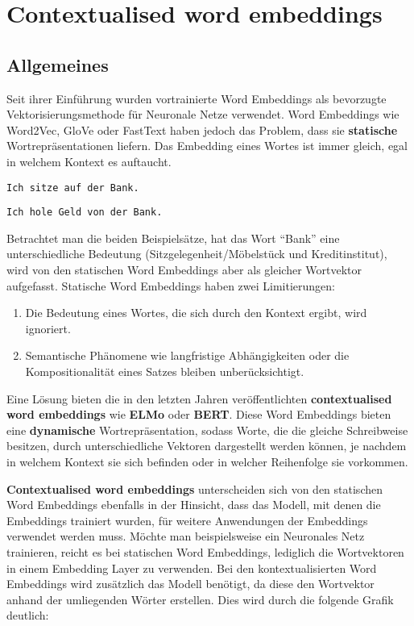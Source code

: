 \documentclass[11pt]{article}
\providecommand{\tightlist}{%
      \setlength{\itemsep}{0pt}\setlength{\parskip}{0pt}}
\begin{document}
    \hypertarget{contextualised-word-embeddings}{%
\section{Contextualised word
embeddings}\label{contextualised-word-embeddings}}

\hypertarget{allgemeines}{%
\subsection{Allgemeines}\label{allgemeines}}

Seit ihrer Einführung wurden vortrainierte Word Embeddings als
bevorzugte Vektorisierungsmethode für Neuronale Netze verwendet. Word
Embeddings wie Word2Vec, GloVe oder FastText haben jedoch das Problem,
dass sie \textbf{statische} Wortrepräsentationen liefern. Das Embedding
eines Wortes ist immer gleich, egal in welchem Kontext es auftaucht.

\texttt{Ich\ sitze\ auf\ der\ Bank.}

\texttt{Ich\ hole\ Geld\ von\ der\ Bank.}

Betrachtet man die beiden Beispielsätze, hat das Wort ``Bank'' eine
unterschiedliche Bedeutung (Sitzgelegenheit/Möbelstück und
Kreditinstitut), wird von den statischen Word Embeddings aber als
gleicher Wortvektor aufgefasst. Statische Word Embeddings haben zwei
Limitierungen:

\begin{enumerate}
\def\labelenumi{\arabic{enumi}.}
\tightlist
\item
  Die Bedeutung eines Wortes, die sich durch den Kontext ergibt, wird
  ignoriert.
\item
  Semantische Phänomene wie langfristige Abhängigkeiten oder die
  Kompositionalität eines Satzes bleiben unberücksichtigt.
\end{enumerate}

Eine Lösung bieten die in den letzten Jahren veröffentlichten
\textbf{contextualised word embeddings} wie \textbf{ELMo} oder
\textbf{BERT}. Diese Word Embeddings bieten eine \textbf{dynamische}
Wortrepräsentation, sodass Worte, die die gleiche Schreibweise besitzen,
durch unterschiedliche Vektoren dargestellt werden können, je nachdem in
welchem Kontext sie sich befinden oder in welcher Reihenfolge sie
vorkommen.

\textbf{Contextualised word embeddings} unterscheiden sich von den
statischen Word Embeddings ebenfalls in der Hinsicht, dass das Modell,
mit denen die Embeddings trainiert wurden, für weitere Anwendungen der
Embeddings verwendet werden muss. Möchte man beispielsweise ein
Neuronales Netz trainieren, reicht es bei statischen Word Embeddings,
lediglich die Wortvektoren in einem Embedding Layer zu verwenden. Bei
den kontextualisierten Word Embeddings wird zusätzlich das Modell
benötigt, da diese den Wortvektor anhand der umliegenden Wörter
erstellen. Dies wird durch die folgende Grafik deutlich:
\end{document}
